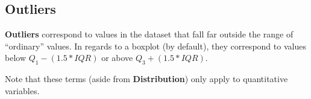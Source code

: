 \documentclass[]{book}
\begin{document}
\hypertarget{outliers}{%
\subsection{Outliers}\label{outliers}}

\textbf{Outliers} correspond to values in the dataset that fall far outside the range of ``ordinary'' values. In regards to a boxplot (by default), they correspond to values below \(Q_1 - (1.5 * IQR)\) or above \(Q_3 + (1.5 * IQR)\).

Note that these terms (aside from \textbf{Distribution}) only apply to quantitative variables.


\end{document}
